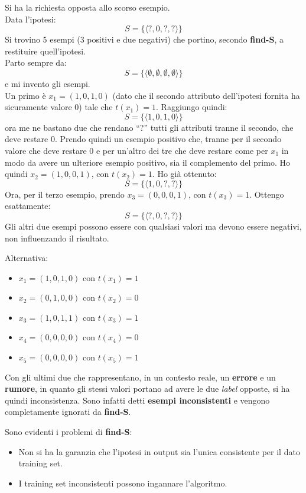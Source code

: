 \begin{esempio}
  Si ha la richiesta opposta allo scorso esempio. \\
  Data l'ipotesi:
  \[S=\{\langle ?, 0,?,?\rangle\}\]
  Si trovino 5 esempi (3 positivi e due negativi) che portino, secondo
  \textbf{find-S}, a restituire quell'ipotesi.\\
  Parto sempre da:
  \[S=\{\langle\emptyset,\emptyset,\emptyset,\emptyset\rangle\}\]
  e mi invento gli esempi.\\
  Un primo è $x_1=(1, 0, 1, 0)$ (dato che il secondo attributo dell'ipotesi fornita ha sicuramente valore 0)
  tale che $t(x_1)=1$. Raggiungo quindi: 
  \[S=\{\langle 1, 0, 1, 0\rangle\}\]
  ora me ne bastano due che rendano ``?'' tutti gli attributi tranne il secondo,
  che deve restare 0. Prendo quindi un esempio positivo che, tranne per il secondo
  valore che deve restare 0 e per un'altro dei tre che deve restare come per
  $x_1$ in modo da avere un ulteriore esempio positivo, sia il complemento del
  primo. Ho quindi $x_2=(1, 0, 0, 1)$, con 
  $t(x_2)=1$. Ho già ottenuto:
  \[S=\{\langle 1, 0,?,?\rangle\}\]
  Ora, per il terzo esempio, prendo $x_3=(0, 0, 0, 1)$, con $t(x_3)=1$. Ottengo
  esattamente:
  \[S=\{\langle ?, 0,?,?\rangle\}\]
  Gli altri due esempi possono essere con qualsiasi valori ma devono essere
  negativi, non influenzando il risultato.\\
  \begin{shaded}
    Alternativa:
    \begin{itemize}
      \item $x_1=(1, 0, 1, 0)$ con $t(x_1)=1$
      \item $x_2=(0, 1, 0, 0)$ con $t(x_2)=0$
      \item $x_3=(1, 0, 1, 1)$ con $t(x_3)=1$
      \item $x_4=(0, 0, 0, 0)$ con $t(x_4)=0$
      \item $x_5=(0, 0, 0, 0)$ con $t(x_5)=1$
    \end{itemize}
    Con gli ultimi due che rappresentano, in un contesto reale,
    un \textbf{errore} e un \textbf{rumore}, in quanto gli stessi valori portano
    ad avere le due \textit{label} opposte, si ha quindi inconsistenza. Sono
    infatti detti \textbf{esempi inconsistenti} e vengono completamente ignorati
    da \textbf{find-S}.
  \end{shaded}
\end{esempio}
Sono evidenti i problemi di \textbf{find-S}:
\begin{itemize}
  \item Non si ha la garanzia che l'ipotesi in output sia l'unica consistente per il dato training set.
  \item I training set inconsistenti possono ingannare l'algoritmo.
\end{itemize}
